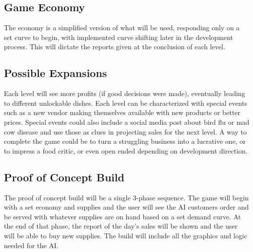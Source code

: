\documentclass{article}
\begin{document}
\subsection{Game Economy}
The economy is a simplified version of what will be used, responding only on a set curve to begin, with implemented curve shifting later in the development process. This will dictate the reports given at the conclusion of each level.

\subsection{Possible Expansions}
Each level will see more profits (if good decisions were made), eventually leading to different unlockable dishes. Each level can be characterized with special events such as a new vendor making themselves available with new products or better prices. Special events could also include a social media post about bird flu or mad cow disease and use those as clues in projecting sales for the next level. A way to complete the game could be to turn a struggling business into a lucrative one, or to impress a food critic, or even open ended depending on development direction.

\subsection{Proof of Concept Build}
The proof of concept build will be a single 3-phase sequence. The game will begin with a set economy and supplies and the user will see the AI customers order and be served with whatever supplies are on hand based on a set demand curve. At the end of that phase, the report of the day's sales will be shown and the user will be able to buy new supplies. The build will include all the graphics and logic needed for the AI.
\vspace{10mm}
\end{document}

